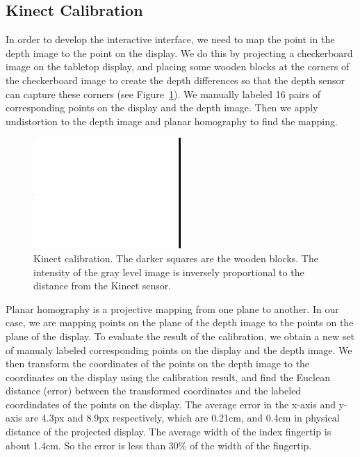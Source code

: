 \subsection{Kinect Calibration}
In order to develop the interactive interface, we need to map the point in the
depth image to the point on the display. We do this by projecting a
checkerboard image on the tabletop display, and placing some wooden blocks at
the corners of the checkerboard image to create the depth differences so that 
the depth sensor can capture these corners (see Figure~\ref{fig:calibration}).
We manually labeled 16 pairs of corresponding points on the display and the depth image. Then we
apply undistortion to the depth image and planar homography to find the mapping.

\begin{figure}[h]
  \centering
  \includegraphics[width=0.5\textwidth]{figures/calibration.png} 
  \caption{Kinect calibration. The darker squares are the wooden blocks. The
  intensity of the gray level image is inversely proportional to the distance
  from the Kinect sensor.}
  \label{fig:calibration}
\end{figure}

Planar homography is a projective mapping from one plane to another. In our
case, we are mapping points on the plane of the depth image to the points
on the plane of the display. To evaluate the result of the calibration, we
obtain a new set of manualy labeled corresponding points on the display and the
depth image. We then transform the coordinates of the points on the depth image
to the coordinates on the display using the calibration result, and find the
Euclean distance (error) between the transformed coordinates and the labeled
coordindates of the points on the display. The average error in the x-axis and
y-axis are 4.3px and 8.9px respectively, which are 0.21cm, and 0.4cm in physical distance of the
projected display. The average width of the index fingertip is about 1.4cm. So
the error is less than 30\% of the width of the fingertip. 

